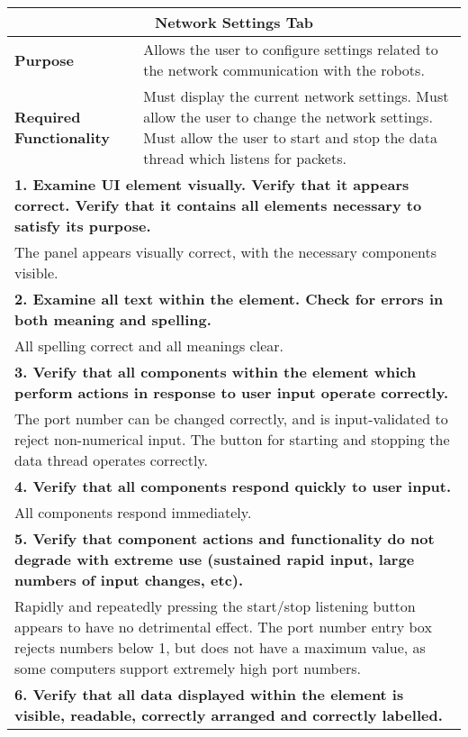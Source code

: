 \begin{longtable}{ l p{10cm} }
 \hline
 \multicolumn{2}{c}{\textbf{Network Settings Tab}}\\
 \hline
 \textbf{Purpose} & Allows the user to configure settings related to the network communication with the robots.\\
 \textbf{Required Functionality} & Must display the current network settings. Must allow the user to change the network settings. Must allow the user to start and stop the data thread which listens for packets.\\
 \hline
 \multicolumn{2}{p{14cm}}{\textbf{1. Examine UI element visually. Verify that it appears correct. Verify that it contains all elements necessary to satisfy its purpose.}}\\
 \multicolumn{2}{p{14cm}}{The panel appears visually correct, with the necessary components visible.}\\
 \hline
 \multicolumn{2}{p{14cm}}{\textbf{2. Examine all text within the element. Check for errors in both meaning and spelling.}}\\
 \multicolumn{2}{p{14cm}}{All spelling correct and all meanings clear.}\\
 \hline
 \multicolumn{2}{p{14cm}}{\textbf{3. Verify that all components within the element which perform actions in response to user input operate correctly.}}\\
 \multicolumn{2}{p{14cm}}{The port number can be changed correctly, and is input-validated to reject non-numerical input. The button for starting and stopping the data thread operates correctly.}\\
 \hline
 \multicolumn{2}{p{14cm}}{\textbf{4. Verify that all components respond quickly to user input.}}\\
 \multicolumn{2}{p{14cm}}{All components respond immediately.}\\
 \hline
 \multicolumn{2}{p{14cm}}{\textbf{5. Verify that component actions and functionality do not degrade with extreme use (sustained rapid input, large numbers of input changes, etc).}}\\
 \multicolumn{2}{p{14cm}}{Rapidly and repeatedly pressing the start/stop listening button appears to have no detrimental effect. The port number entry box rejects numbers below 1, but does not have a maximum value, as some computers support extremely high port numbers.}\\
 \hline
 \multicolumn{2}{p{14cm}}{\textbf{6. Verify that all data displayed within the element is visible, readable, correctly arranged and correctly labelled.}}\\

\end{longtable}
